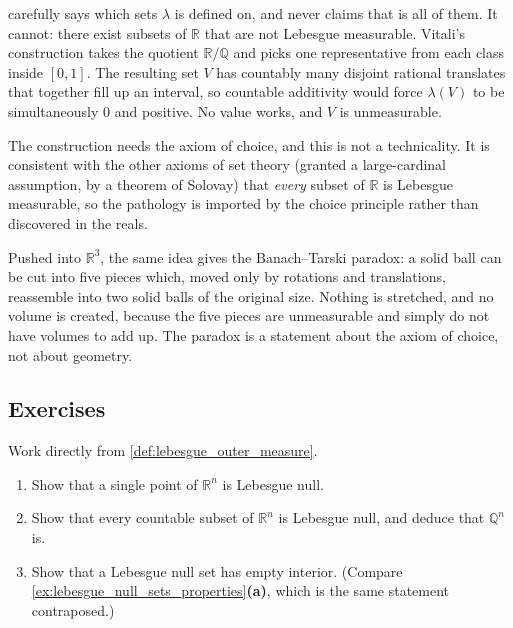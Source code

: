 \begin{aside}
\label{aside:vitali_banach_tarski}
 carefully says which sets $\lambda$ is defined on, and never
claims that is all of them. It cannot: there exist subsets of $\mathbb{R}$ that are not Lebesgue
measurable. Vitali's construction takes the quotient $\mathbb{R}/\mathbb{Q}$ and picks one
representative from each class inside $[0,1]$. The resulting set $V$ has countably many disjoint
rational translates that together fill up an interval, so countable additivity would force
$\lambda(V)$ to be simultaneously $0$ and positive. No value works, and $V$ is unmeasurable.

The construction needs the axiom of choice, and this is not a technicality. It is consistent with
the other axioms of set theory (granted a large-cardinal assumption, by a theorem of Solovay) that
\emph{every} subset of $\mathbb{R}$ is Lebesgue measurable, so
the pathology is imported by the choice principle rather than discovered in the reals.

Pushed into $\mathbb{R}^3$, the same idea gives the Banach--Tarski paradox: a solid ball can be cut
into five pieces which, moved only by rotations and translations, reassemble into two solid balls
of the original size. Nothing is stretched, and no volume is created, because the five pieces are
unmeasurable and simply do not have volumes to add up. The paradox is a statement about the axiom
of choice, not about geometry.
\end{aside}

\subsection{Exercises}

\begin{aiexercise}
\label{ex:ai_lebesgue_null_countable}
Work directly from \cref{def:lebesgue_outer_measure}.
\begin{enumerate}[label=\textbf{(\alph*)}]
  \item Show that a single point of $\mathbb{R}^n$ is Lebesgue null.
  \item Show that every countable subset of $\mathbb{R}^n$ is Lebesgue null, and deduce that
    $\mathbb{Q}^n$ is.
  \item Show that a Lebesgue null set has empty interior. (Compare
    \cref{ex:lebesgue_null_sets_properties}\textbf{(a)}, which is the same statement contraposed.)
\end{enumerate}
\end{aiexercise}

